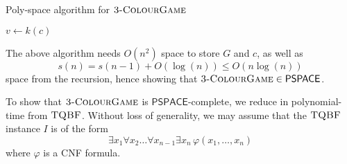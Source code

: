 \documentclass{article}
\newcommand{\TQBF}[0]{\textsc{TQBF}}
\newcommand{\game}[0]{\textsc{3-ColourGame}}
\newcommand{\PSPACE}[0]{\mathsf{PSPACE}}
\begin{document}
\begin{algorithm}
	\caption{Poly-space algorithm for $\game$}
	\label{alg:algorithm-label}
	\begin{algorithmic}[1]
		\State {}
		\EndIf
		\State $v \gets k(c)$
		\State {}
		\EndIf
		\EndFor

		\State {}
		\EndProcedure

		\vspace{1em}

		\State {}
		\EndProcedure
	\end{algorithmic}
\end{algorithm}

The above algorithm needs $O(n^2)$ space to store $G$ and $c$, as well as
\[
	s(n) = s(n-1) + O(\log(n)) \leq O(n \log(n))
\]
space from the recursion, hence showing that $\game \in \PSPACE$.

To show that $\game$ is $\PSPACE$-complete, we reduce in polynomial-time from $\TQBF$. Without loss of generality, we may assume that the $\TQBF$ instance $I$ is of the form
\[
	\exists x_1 \forall x_2 \ldots \forall x_{n-1} \exists x_n \, \varphi(x_1, \ldots, x_n)
\]
where $\varphi$ is a CNF formula.
\end{document}
